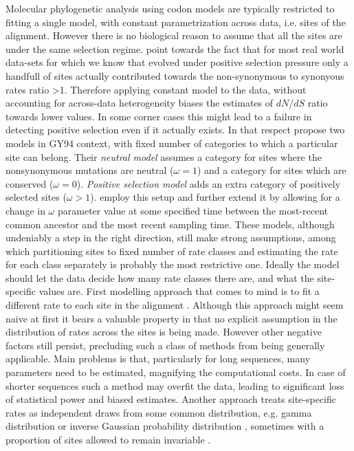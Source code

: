 Molecular phylogenetic analysis using codon models are typically restricted to fitting a single model, with constant parametrization across data, i.e. sites of the alignment.
However there is no biological reason to assume that all the sites are under the same selection regime.
\cite{NY98} point towards the fact that for most real world data-sets for which we know that evolved under positive selection pressure only a handfull of sites actually contributed towards the non-synonymous to synonyous rates ratio >1.
Therefore applying constant model to the data, without accounting for across-data heterogeneity biases the estimates of $dN/dS$ ratio towards lower values.
In some corner cases this might lead to a failure in detecting positive selection even if it actually exists.  
In that respect \cite{NY98} propose two models in GY94 context, with fixed number of categories to which a particular site can belong.
Their \emph{neutral model} assumes a category for sites where the nonsynonymous mutations are neutral ($\omega=1$) and a category for sites which are conserved ($\omega=0$).
\emph{Positive selection model} adds an extra category of positively selected sites ($\omega>1$).
\cite{Goode2008} employ this setup and further extend it by allowing for a change in $\omega$ parameter value at some specified time between the most-recent common ancestor and the most recent sampling time.
These models, although undeniably a step in the right direction, still make strong assumptions, among which partitioning sites to fixed number of rate classes and estimating the rate for each class separately is probably the most restrictive one.
Ideally the model should let the data decide how many rate classes there are, and what the site-specific values are.
First modelling approach that comes to mind is to fit a different rate to each site in the alignment \citep{Nielsen1997}.
Although this approach might seem naive at first it bears a valuable property in that no explicit assumption in the distribution of rates across the sites is being made.
However other negative factors still persist, precluding such a class of methods from being generally applicable.
Main problems is that, particularly for long sequences, many parameters need to be estimated, magnifying the computational costs.
In case of shorter sequences such a method may overfit the data, leading to significant loss of statistical power and biased estimates.
Another approach treats site-specific rates as independent draws from some common distribution, e.g. gamma distribution \citep{Yang1993} or inverse Gaussian probability distribution \citep{Waddell1997}, sometimes with a proportion of sites allowed to remain invariable \citep{Gu1995}.

